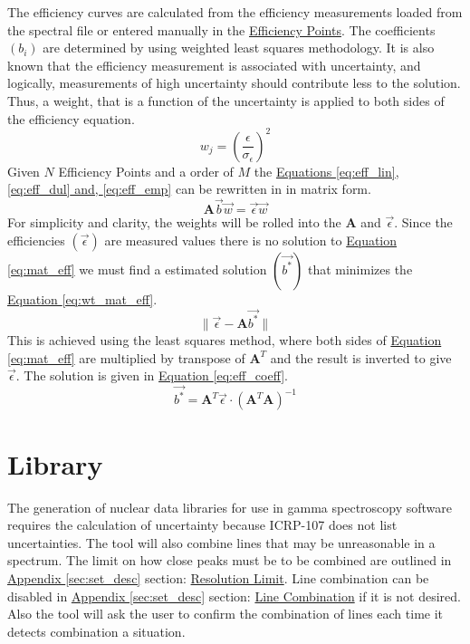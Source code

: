 \documentclass[12pt,report,justified]{SANDreport}
\begin{document}
The efficiency curves are calculated from the efficiency measurements loaded from the spectral file
or entered manually in the \hyperref[itm:eff_pts]{Efficiency Points}. The coefficients \(\left( b_i \right)\) are determined by using weighted
least squares methodology. It is also known that the efficiency measurement is associated with
uncertainty, and logically, measurements of high uncertainty should contribute less to the solution.
Thus, a weight, that is a function of the uncertainty is applied to both sides of the efficiency
equation.
\begin{equation}
w_j = \left( \frac{\epsilon}{\sigma_{\epsilon}} \right)^2
\label{eq:eff_wgt}
\end{equation}
Given \(N\) Efficiency Points and a order of \(M\) the \hyperref[eq:eff_lin]{Equations \ref{eq:eff_lin}, \ref{eq:eff_dul} and, \ref{eq:eff_emp}} can be rewritten in in matrix form.
\begin{equation}
\mathbf{A} \overrightarrow{b} \overrightarrow{w} = \overrightarrow{\epsilon} \overrightarrow{w}
\label{eq:mat_eff}
\end{equation}
For simplicity and clarity, the weights will be rolled into the \(\mathbf{A}\) and \(\overrightarrow{\epsilon}\). Since the efficiencies 
\(\left(\overrightarrow{\epsilon}\right)\) are measured values there is no solution to \hyperref[eq:mat_eff]{Equation \ref{eq:mat_eff}} we must find a estimated solution \(\left(\overrightarrow{b^*}\right)\) that minimizes the \hyperref[eq:wt_mat_eff]{Equation \ref{eq:wt_mat_eff}}.
\begin{equation}
\| \overrightarrow{\epsilon} - \mathbf{A}\overrightarrow{b^*} \|
\label{eq:wt_mat_eff}
\end{equation}
This is achieved using the least squares method, where both sides of \hyperref[eq:mat_eff]{Equation \ref{eq:mat_eff}} are multiplied by
transpose of \(\mathbf{A}^T\) and the result is inverted to give \(\overrightarrow{\epsilon }\). The solution is given in \hyperref[eq:eff_coeff]{Equation \ref{eq:eff_coeff}}.
\begin{equation}
\overrightarrow{b^*} = \mathbf{A}^T\overrightarrow{\epsilon} \cdot \left( \mathbf{A}^T \mathbf{A} \right)^{-1}
\label{eq:eff_coeff}
\end{equation}


\section{Library} \label{sec:library}
The generation of nuclear data libraries for use in gamma spectroscopy software requires the calculation
of uncertainty because ICRP-107 does not list uncertainties. The tool will also combine
lines that may be unreasonable in a spectrum. The limit on how close peaks must be to be combined
are outlined in \hyperref[sec:set_desc]{Appendix \ref{sec:set_desc}} section: \hyperref[itm:res_lim]{Resolution Limit}. Line combination can be disabled
in \hyperref[sec:set_desc]{Appendix \ref{sec:set_desc}} section: \hyperref[itm:ln_combo]{Line Combination} if it is not desired. Also the tool will ask the user to
confirm the combination of lines each time it detects combination a situation.
\end{document}
